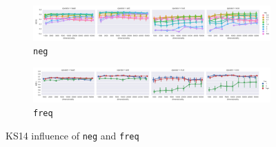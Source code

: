 \begin{figure}
  \centering

  \begin{subfigure}[t]{\textwidth}
    \includegraphics[width=1.1\textwidth]{supplement/figures/ks14-interaction-neg}

  \caption{\texttt{neg}}
  \label{fig:ks14-neg}
  \end{subfigure}

  \begin{subfigure}[t]{\textwidth}
    \includegraphics[width=1.1\textwidth]{supplement/figures/ks14-interaction-freq}

  \caption{\texttt{freq}}
  \label{fig:ks14-freq}
  \end{subfigure}

  \caption{KS14 influence of \texttt{neg} and \texttt{freq}}
\end{figure}

